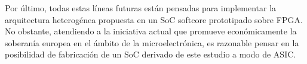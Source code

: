 Por último, todas estas líneas futuras están pensadas para implementar la arquitectura heterogénea propuesta en un SoC softcore prototipado sobre FPGA.
No obstante, atendiendo a la iniciativa actual que promueve económicamente la soberanía europea en el ámbito de la microelectrónica, es razonable pensar en la posibilidad de fabricación de un SoC derivado de este estudio a modo de ASIC.
  



%



